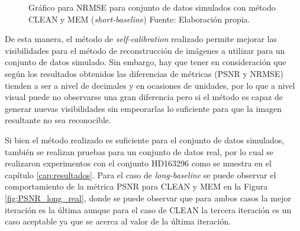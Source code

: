 \begin{figure}[!ht]
 \centering
 \caption[Gráfico para NRMSE para conjunto de datos simulados con método CLEAN y MEM (\textit{short-baseline})]{Gráfico para NRMSE para conjunto de datos simulados con método CLEAN y MEM (\textit{short-baseline}) Fuente: Elaboración propia.}
 \label{fig:NRMSE_short_sim}
\end{figure}

De esta manera, el método de \textit{self-calibration} realizado permite mejorar las visibilidades para el método de reconstrucción de imágenes a utilizar para un conjunto de datos simulado. Sin embargo, hay que tener en consideración que según los resultados obtenidos las diferencias de métricas (PSNR y NRMSE) tienden a ser a nivel de decimales y en ocasiones de unidades, por lo que a nivel visual puede no observarse una gran diferencia pero si el método es capaz de generar nuevas visibilidades sin empeorarlas lo suficiente para que la imagen resultante no sea reconocible. 

Si bien el método realizado es suficiente para el conjunto de datos simulados, también se realizan pruebas para un conjunto de datos real, por lo cual se realizaron experimentos con el conjunto HD163296 como se muestra en el capítulo \ref{cap:resultados}. Para el caso de \textit{long-baseline} se puede observar el comportamiento de la métrica PSNR para CLEAN y MEM en la Figura \ref{fig:PSNR_long_real}, donde se puede observar que para ambos casos la mejor iteración es la última aunque para el caso de CLEAN la tercera iteración es un caso aceptable ya que se acerca al valor de la última iteración. 

